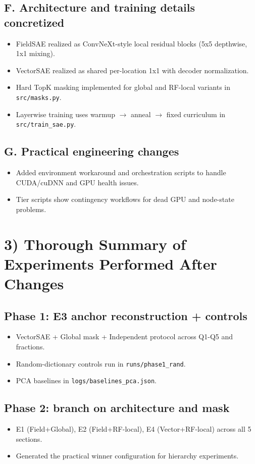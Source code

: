 \documentclass[11pt]{article}
\begin{document}
\subsection{F. Architecture and training details concretized}
\begin{itemize}[leftmargin=*]
    \item FieldSAE realized as ConvNeXt-style local residual blocks (5x5 depthwise, 1x1 mixing).
    \item VectorSAE realized as shared per-location 1x1 with decoder normalization.
    \item Hard TopK masking implemented for global and RF-local variants in \texttt{src/masks.py}.
    \item Layerwise training uses warmup $\rightarrow$ anneal $\rightarrow$ fixed curriculum in \texttt{src/train\_sae.py}.
\end{itemize}

\subsection{G. Practical engineering changes}
\begin{itemize}[leftmargin=*]
    \item Added environment workaround and orchestration scripts to handle CUDA/cuDNN and GPU health issues.
    \item Tier scripts show contingency workflows for dead GPU and node-state problems.
\end{itemize}

\section{3) Thorough Summary of Experiments Performed After Changes}
\subsection{Phase 1: E3 anchor reconstruction + controls}
\begin{itemize}[leftmargin=*]
    \item VectorSAE + Global mask + Independent protocol across Q1-Q5 and fractions.
    \item Random-dictionary controls run in \texttt{runs/phase1\_rand}.
    \item PCA baselines in \texttt{logs/baselines\_pca.json}.
\end{itemize}

\subsection{Phase 2: branch on architecture and mask}
\begin{itemize}[leftmargin=*]
    \item E1 (Field+Global), E2 (Field+RF-local), E4 (Vector+RF-local) across all 5 sections.
    \item Generated the practical winner configuration for hierarchy experiments.
\end{itemize}
\end{document}
